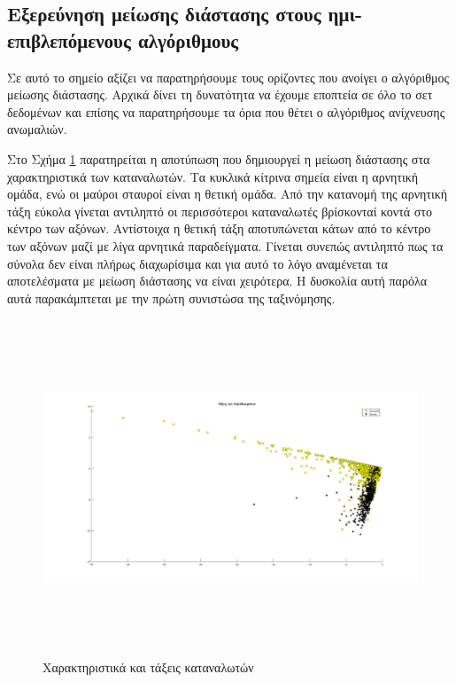 \subsection{Εξερεύνηση μείωσης διάστασης στους ημι-επιβλεπόμενους αλγόριθμους}
Σε αυτό το σημείο αξίζει να παρατηρήσουμε τους ορίζοντες που ανοίγει ο αλγόριθμος μείωσης διάστασης. Αρχικά δίνει τη δυνατότητα να έχουμε εποπτεία σε όλο το σετ δεδομένων και επίσης να παρατηρήσουμε τα όρια που θέτει ο αλγόριθμος ανίχνευσης ανωμαλιών.\par
Στο Σχήμα \ref{fig:charclasscons} παρατηρείται η αποτύπωση που δημιουργεί η μείωση διάστασης στα χαρακτηριστικά των καταναλωτών. Τα κυκλικά κίτρινα σημεία είναι η αρνητική ομάδα, ενώ οι μαύροι σταυροί είναι η θετική ομάδα. Από την κατανομή της αρνητική τάξη εύκολα γίνεται αντιληπτό οι περισσότεροι καταναλωτές βρίσκονταί κοντά στο κέντρο των αξόνων. Αντίστοιχα η θετική τάξη αποτυπώνεται κάτων από το κέντρο των αξόνων μαζί με λίγα αρνητικά παραδείγματα. Γίνεται συνεπώς αντιληπτό πως τα σύνολα δεν είναι πλήρως διαχωρίσιμα και για αυτό το λόγο αναμένεται τα αποτελέσματα με μείωση διάστασης να είναι χειρότερα. Η δυσκολία αυτή παρόλα αυτά παρακάμπτεται με την πρώτη συνιστώσα της ταξινόμησης.\par
\begin{figure}[ht!]
 \includegraphics[width=160mm, height=100mm]{../../plots/gr_class_semi_sup.png}
\caption{Χαρακτηριστικά και τάξεις καταναλωτών}
\label{fig:charclasscons}
\end{figure}

